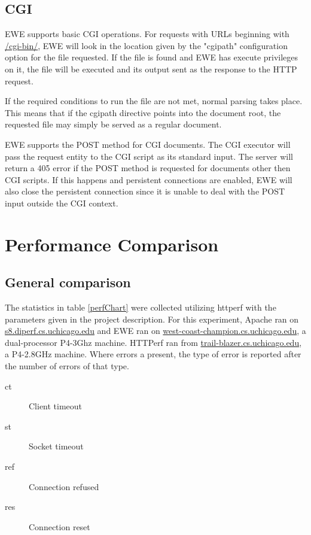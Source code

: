 \documentclass{article}
\begin{document}
\subsection{CGI}\label{cgi}
EWE supports basic CGI operations.
For requests with URLs beginning with \url{/cgi-bin/}, EWE will look in the location given by the "cgipath" configuration option for the file requested.
If the file is found and EWE has execute privileges on it, the file will be executed and its output sent as the response to the HTTP request.

If the required conditions to run the file are not met, normal parsing takes place.
This means that if the cgipath directive points into the document root, the requested file may simply be served as a regular document.

EWE supports the POST method for CGI documents.
The CGI executor will pass the request entity to the CGI script as its standard input.
The server will return a 405 error if the POST method is requested for documents other then CGI scripts.
If this happens and persistent connections are enabled, EWE will also close the persistent connection since it is unable to deal with the POST input outside the CGI context.

\section{Performance Comparison}
\subsection{General comparison}
The statistics in table \ref{perfChart} were collected utilizing httperf with the parameters given in the project description.
For this experiment, Apache ran on \url{s8.diperf.cs.uchicago.edu} and EWE ran on \url{west-coast-champion.cs.uchicago.edu}, a dual-processor P4-3Ghz machine.
HTTPerf ran from \url{trail-blazer.cs.uchicago.edu}, a P4-2.8GHz machine.
Where errors a present, the type of error is reported after the number of errors of that type.
\begin{description}
\item[ct] Client timeout
\item [st] Socket timeout
\item [ref] Connection refused
\item [res] Connection reset
\end{description}
\end{document}
